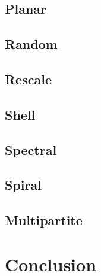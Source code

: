 \documentclass[11pt]{beamer}
\begin{document}
\subsection{Planar}
\begin{frame}{\subsecname}
\end{frame}

\subsection{Random}
\begin{frame}{\subsecname}
\end{frame}

\subsection{Rescale}
\begin{frame}{\subsecname}
\end{frame}

\subsection{Shell}
\begin{frame}{\subsecname}
\end{frame}

\subsection{Spectral}
\begin{frame}{\subsecname}
\end{frame}

\subsection{Spiral}
\begin{frame}{\subsecname}
\end{frame}

\subsection{Multipartite}
\begin{frame}{\subsecname}
\end{frame}

\section{Conclusion}

\end{document}
